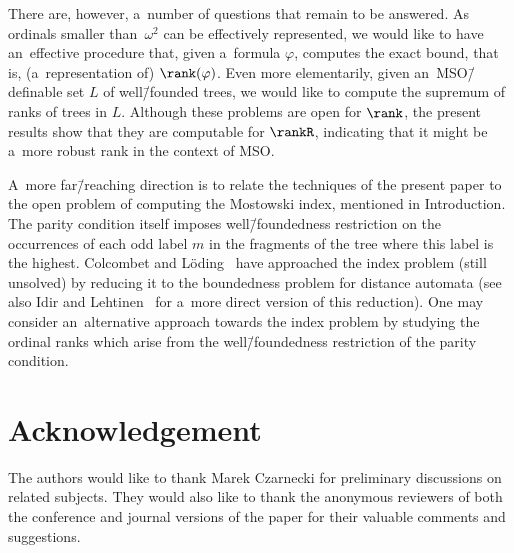 There are, however, a~number of questions that remain to be answered.
As ordinals smaller than~$\omega^2$ can be effectively represented, we would like to have an~effective procedure that, given a~formula $\varphi$, computes the exact bound,
that is, (a~representation of) $\rank(\varphi)$.
Even more elementarily, given an~MSO\=/definable set $L$ of
well\=/founded trees, we would like to compute the supremum of ranks of trees in $L$. Although these problems are open for $\rank$, the present results show that they are computable for $\rankR$, indicating that it might be a~more robust rank in the context of MSO.

A~more far\=/reaching direction is to relate the techniques of the present paper to the open problem of computing the Mostowski index, mentioned in Introduction.
The parity condition itself imposes well\=/foundedness restriction on the occurrences of each odd label $m$ in the fragments of the tree where this label is the highest.
Colcombet and Löding~\cite{loding_index_to_bounds} have approached the index problem (still unsolved) by reducing it to the boundedness problem for distance automata
(see also Idir and Lehtinen~\cite{lehtinen_mostowski} for a~more direct version of this reduction).
One may consider an~alternative approach towards the index problem by studying the ordinal ranks which arise from the well\=/foundedness restriction of the parity condition.


\section*{Acknowledgement}\noindent
The authors would like to thank Marek Czarnecki for preliminary discussions on related subjects.
They would also like to thank the anonymous reviewers of both the conference and journal versions of the paper for their valuable comments and suggestions.



